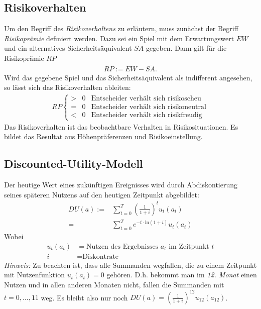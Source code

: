 \documentclass[12pt,a4paper]{scrartcl}
\begin{document}
\subsection{Risikoverhalten}
Um den Begriff des \textit{Risikoverhaltens} zu erläutern, muss zunächst der Begriff \textit{Risikoprämie} definiert werden. Dazu sei ein Spiel mit dem Erwartungswert $ EW $ und ein alternatives Sicherheitsäquivalent $ S\ddot{A} $ gegeben. Dann gilt für die Risikoprämie $ RP $
\begin{align*}
	RP := EW - S\ddot{A}.
\end{align*}
Wird das gegebene Spiel und das Sicherheitsäquivalent als indifferent angesehen, so lässt sich das Risikoverhalten ableiten:
\begin{align*}
	RP \left\lbrace \begin{array}{ccl}
	> & 0 & \text{Entscheider verhält sich risikoscheu}\\
	= & 0 & \text{Entscheider verhält sich risikoneutral}\\
	< & 0 & \text{Entscheider verhält sich risikfreudig}
	\end{array}\right.
\end{align*}
Das Risikoverhalten ist das beobachtbare Verhalten in Risikosituationen. Es bildet das Resultat aus Höhenpräferenzen und Risikoeinstellung.

\subsection{Discounted-Utility-Modell}
Der heutige Wert eines zukünftigen Ereignisses wird durch Abdiskontierung seines späteren Nutzens auf den heutigen Zeitpunkt abgebildet:
\begin{align*}
	DU(a) :=& \sum_{t=0}^{T} \left(\frac{1}{1+i}\right)^t u_t(a_t) \\
	=& \sum_{t=0}^{T} e^{-t\cdot \text{ln}(1+i)} u_t(a_t)
\end{align*}
Wobei
\begin{align*}
	u_t(a_t) &= \text{Nutzen des Ergebnisses } a_t \text{ im Zeitpunkt } t\\
	i &= \text{Diskontrate}
\end{align*}
\textit{Hinweis:} Zu beachten ist, dass alle Summanden wegfallen, die zu einem Zeitpunkt mit Nutzenfunktion $ u_t(a_t) = 0 $ gehören. D.h. bekommt man im \textit{12. Monat} einen Nutzen und in allen anderen Monaten nicht, fallen die Summanden mit $ t = 0, \dots, 11 $ weg. Es bleibt also nur noch $ DU(a) = \left(\frac{1}{1+i}\right)^{12} u_{12}(a_{12}) $.
\end{document}
